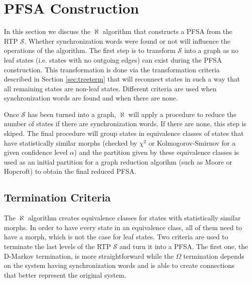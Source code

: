 {\section{PFSA Construction \label{sec:pfsacons}}

In this section we discuss the $\aleph$ algorithm that constructs a PFSA from the RTP $\mathcal{S}$. Whether synchronization words were found or not will influence the operations of the algorithm. The first step is to transform $\mathcal{S}$ into a graph as no leaf states (i.e. states with no outgoing edges) can exist during the PFSA construction. This transformation is done via the transformation criteria described in Section \ref{sec:treeterm} that will reconnect states in such a way that all remaining states are non-leaf states. Different criteria are used when synchronization words are found and when there are none.

Once $\mathcal{S}$ has been turned into a graph, $\aleph$ will apply a procedure to reduce the number of states if there are synchronization words. If there are none, this step is skiped. The final procedure will group states in equivalence classes of states that have statistically similar morphs (checked by $\chi^2$ or Kolmogorov-Smirnov for a given confidence level $\alpha$) and the partition given by these equivalence classes is used as an initial partition for a graph reduction algorihm (such as Moore or Hopcroft) to obtain the final reduced PFSA.

\subsection{Termination Criteria\label{sec:treeterm}}

The $\aleph$ algorithm creates equivalence classes for states with statistically similar morphs. In order to have every state in an equivalence class, all of them need to have a morph, which is not the case for leaf states. Two criteria are used to terminate the last levels of the RTP $\mathcal{S}$ and turn it into a PFSA. The first one, the D-Markov termination, is more straightforward while the $\Omega$ termination depends on the system having synchronization words and is able to create connections that better represent the original system.

}
